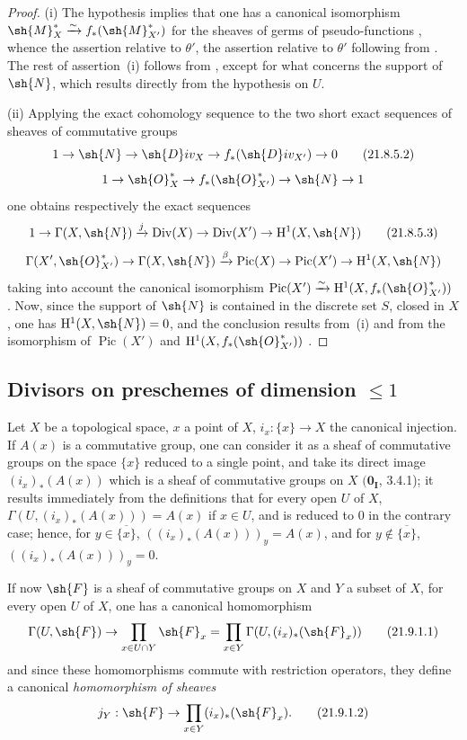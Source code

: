 \begin{proof}
(i) The hypothesis implies that one has a canonical isomorphism $\sh{M}_X^*\xrightarrow{\sim}f_*(\sh{M}_{X'}^*)$ for the sheaves of germs of pseudo-functions , whence the assertion relative to $\theta'$, the assertion relative to $\theta'$ following from .
The rest of assertion~(i) follows from , except for what concerns the support of $\sh{N}$, which results directly from the hypothesis on $U$.

(ii) Applying the exact cohomology sequence to the two short exact sequences of sheaves of commutative groups
\[
\label{IV.21.8.5.2}
  1\to\sh{N}\to\sh{D}iv_X\to f_*(\sh{D}iv_{X'})\to 0
  \tag{21.8.5.2}
\]
\[
  1\to\sh{O}_X^*\to f_*(\sh{O}_{X'}^*)\to\sh{N}\to 1
\]
one obtains respectively the exact sequences
\[
\label{IV.21.8.5.3}
  1\to\Gamma(X,\sh{N})\xrightarrow{j}\operatorname{Div}(X)\to\operatorname{Div}(X')\to\mathrm{H}^1(X,\sh{N})
  \tag{21.8.5.3}
\]
\[
  \Gamma(X',\sh{O}_{X'}^*)\to\Gamma(X,\sh{N})\xrightarrow{\beta}\operatorname{Pic}(X)\to\operatorname{Pic}(X')\to\mathrm{H}^1(X,\sh{N})
\]
taking into account the canonical isomorphism $\operatorname{Pic}(X')\xrightarrow{\sim}\mathrm{H}^1(X,f_*(\sh{O}_{X'}^*))$ .
Now, since the support of $\sh{N}$ is contained in the discrete set $S$, closed in $X$, one has $\mathrm{H}^1(X,\sh{N})=0$, and the conclusion results from~(i) and from the isomorphism of $\operatorname{Pic}(X')$ and $\mathrm{H}^1(X,f_*(\sh{O}_{X'}^*))$ .
\end{proof}

\subsection{Divisors on preschemes of dimension $\leq 1$}
\label{IV.21.9}


\begin{env}[21.9.1]
\label{IV.21.9.1}
Let $X$ be a topological space, $x$ a point of $X$, $i_x:\{x\}\to X$ the canonical injection.
If $A(x)$ is a commutative group, one can consider it as a sheaf of commutative groups on the space $\{x\}$ reduced to a single point, and take its direct image $(i_x)_*(A(x))$ which is a sheaf of commutative groups on $X$ $(\mathbf{0_I}$, 3.4.1);
it results immediately from the definitions that for every open $U$ of $X$, $\Gamma(U,(i_x)_*(A(x)))=A(x)$ if $x\in U$, and is reduced to $0$ in the contrary case;
hence, for $y\in\overline{\{x\}}$, $((i_x)_*(A(x)))_y=A(x)$, and for $y\notin\overline{\{x\}}$, $((i_x)_*(A(x)))_y=0$.

If now $\sh{F}$ is a sheaf of commutative groups on $X$ and $Y$ a subset of $X$, for every open $U$ of $X$, one has a canonical homomorphism
\[
\label{IV.21.9.1.1}
  \Gamma(U,\sh{F})\to\prod_{x\in U\cap Y}\sh{F}_x=\prod_{x\in Y}\Gamma(U,(i_x)_*(\sh{F}_x))
  \tag{21.9.1.1}
\]
and since these homomorphisms commute with restriction operators, they define a canonical \emph{homomorphism of sheaves}
\[
\label{IV.21.9.1.2}
  j_Y:\sh{F}\to\prod_{x\in Y}(i_x)_*(\sh{F}_x).
  \tag{21.9.1.2}
\]
\end{env}

